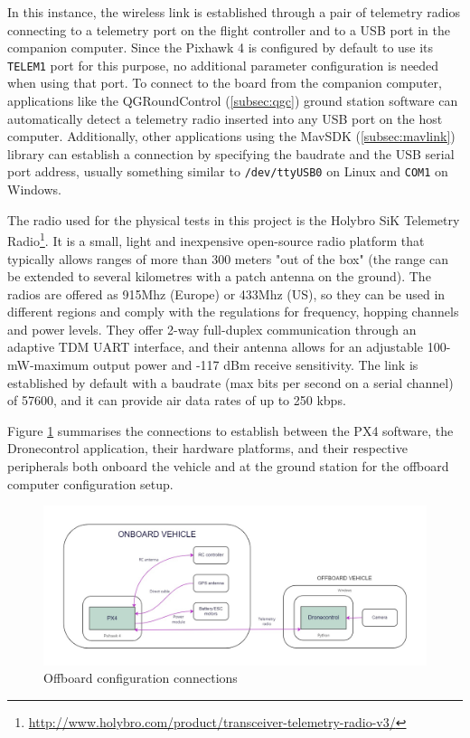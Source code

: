 In this instance, the wireless link is established through a pair of telemetry radios connecting to a telemetry port on the flight controller and to a USB port in the companion computer.
Since the Pixhawk 4 is configured by default to use its \texttt{TELEM1} port for this purpose, no additional parameter configuration is needed when using that port.
To connect to the board from the companion computer, applications like the QGRoundControl (\ref{subsec:qgc}) ground station software can automatically detect a telemetry radio inserted into any USB port on the host computer.
Additionally, other applications using the MavSDK (\ref{subsec:mavlink}) library can establish a connection by specifying the baudrate and the USB serial port address, usually something similar to \texttt{/dev/ttyUSB0} on Linux and \texttt{COM1} on Windows.

The radio used for the physical tests in this project is the Holybro SiK Telemetry Radio\footnote{\url{http://www.holybro.com/product/transceiver-telemetry-radio-v3/}}.
It is a small, light and inexpensive open-source radio platform that typically allows ranges of more than 300 meters "out of the box" (the range can be extended to several kilometres with a patch antenna on the ground).
The radios are offered as 915Mhz (Europe) or 433Mhz (US), so they can be used in different regions and comply with the regulations for frequency, hopping channels and power levels.
They offer 2-way full-duplex communication through an adaptive TDM UART interface, and their antenna allows for an adjustable 100-mW-maximum output power and -117 dBm receive sensitivity.
The link is established by default with a baudrate (max bits per second on a serial channel) of 57600, and it can provide air data rates of up to 250 kbps.

Figure \ref{fig:offboard-config} summarises the connections to establish between the PX4 software, the Dronecontrol application, their hardware platforms, and their respective peripherals both onboard the vehicle and at the ground station for the offboard computer configuration setup.

\begin{figure}
  \centering
  \includegraphics[width=\textwidth,keepaspectratio]{img/offboard-diagram.jpg}
  \caption{Offboard configuration connections}
  \label{fig:offboard-config}
\end{figure}


